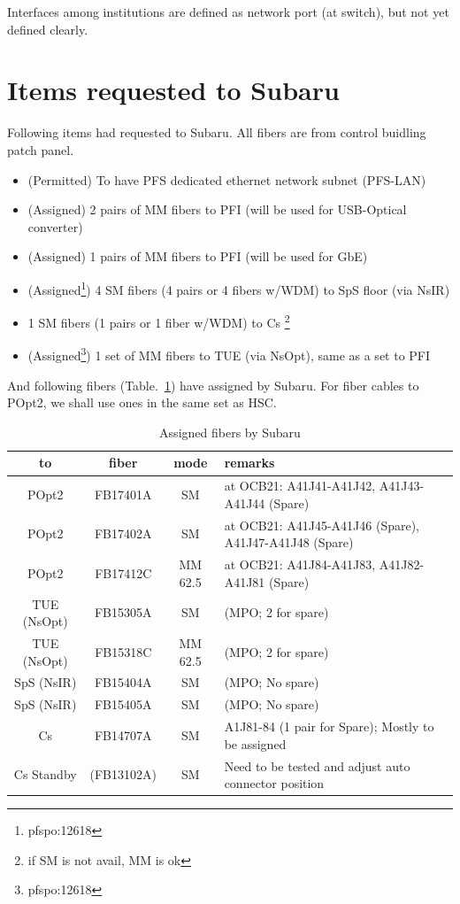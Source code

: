 \documentclass[a4paper,notitlepage]{article}
\begin{document}
Interfaces among institutions are defined as network port (at switch), 
but not yet defined clearly. 

\section{Items requested to Subaru}

Following items had requested to Subaru. 
All fibers are from control buidling patch panel. 

\begin{itemize}
  \item (Permitted) To have PFS dedicated ethernet network subnet (PFS-LAN)
  \item (Assigned) 2 pairs of MM fibers to PFI
    (will be used for USB-Optical converter)
  \item (Assigned) 1 pairs of MM fibers to PFI
    (will be used for GbE)
  \item (Assigned\footnote{pfspo:12618}) 
    4 SM fibers (4 pairs or 4 fibers w/WDM) to SpS floor (via NsIR)
  \item 1 SM fibers (1 pairs or 1 fiber w/WDM) to Cs
    \footnote{if SM is not avail, MM is ok}
  \item (Assigned\footnote{pfspo:12618}) 
    1 set of MM fibers to TUE (via NsOpt), same as a set to PFI
\end{itemize}

And following fibers (Table.~\ref{tab:subaru-fiber}) have assigned by Subaru. 
For fiber cables to POpt2, we shall use ones in the same set as HSC. 

\begin{table}[htb]
\begin{center}
\caption{Assigned fibers by Subaru}
\label{tab:subaru-fiber}
\begin{tabular}{c|c|c|l}
to & fiber & mode & remarks \\
\hline
POpt2 & FB17401A & SM & at OCB21: A41J41-A41J42, A41J43-A41J44 (Spare) \\
POpt2 & FB17402A & SM & at OCB21: A41J45-A41J46 (Spare), A41J47-A41J48 (Spare) \\
POpt2 & FB17412C & MM 62.5 & at OCB21: A41J84-A41J83, A41J82-A41J81 (Spare) \\
\hline
TUE (NsOpt) & FB15305A & SM & (MPO; 2 for spare) \\
TUE (NsOpt) & FB15318C & MM 62.5 & (MPO; 2 for spare) \\
\hline
SpS (NsIR) & FB15404A & SM & (MPO; No spare) \\
SpS (NsIR) & FB15405A & SM & (MPO; No spare) \\
\hline
Cs & FB14707A & SM & A1J81-84 (1 pair for Spare); Mostly to be assigned \\
Cs Standby & (FB13102A) & SM & Need to be tested and adjust auto connector position
\end{tabular}
\end{center}
\end{table}
\end{document}
